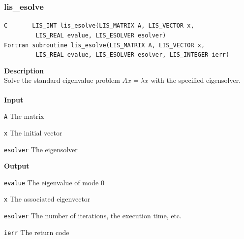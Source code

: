 \documentclass[a4paper]{article}
\newcommand{\namelistlabel}[1]{\mbox{#1}\hfill}
\newenvironment{namelist}[1]{%
\begin{list}{}
  {\let\makelabel\namelistlabel
  \settowidth{\labelwidth}{#1}
  \setlength{\leftmargin}{1.1\labelwidth}}
  }{%
\end{list}}
\begin{document}
\subsubsection{lis\_esolve}
\begin{screen}
\verb|C       LIS_INT lis_esolve(LIS_MATRIX A, LIS_VECTOR x,|\\ 
\verb|         LIS_REAL evalue, LIS_ESOLVER esolver)|\\
\verb|Fortran subroutine lis_esolve(LIS_MATRIX A, LIS_VECTOR x,|\\
\verb|         LIS_REAL evalue, LIS_ESOLVER esolver, LIS_INTEGER ierr)|
\end{screen}
{\bf Description}\\
\indent
Solve the standard eigenvalue problem $Ax = \lambda x$ with the specified eigensolver.
\\ \\
\noindent
{\bf Input}
\begin{namelist}{XXXXXXXXXXXXXXXXXXXX}
\item[\tt A] The matrix
\item[\tt x] The initial vector
\item[\tt esolver] The eigensolver
\end{namelist}
{\bf Output}
\begin{namelist}{XXXXXXXXXXXXXXXXXXXX}
\item[\tt evalue] The eigenvalue of mode 0
\item[\tt x] The associated eigenvector
\item[\tt esolver] The number of iterations, the execution time, etc.
\item[\tt ierr] The return code
\end{namelist}
\end{document}
